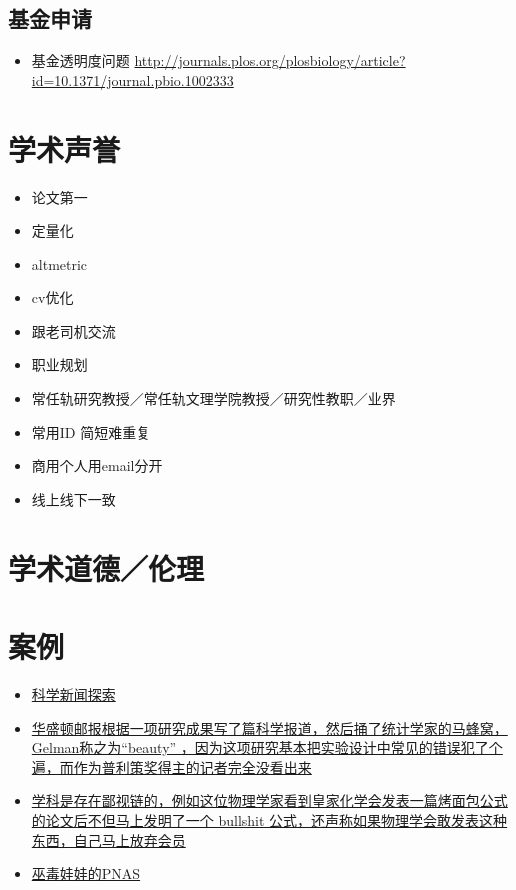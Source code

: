 \documentclass[]{book}
\providecommand{\tightlist}{%
  \setlength{\itemsep}{0pt}\setlength{\parskip}{0pt}}
\begin{document}
\subsection{基金申请}

\begin{itemize}
\tightlist
\item
  基金透明度问题
  \url{http://journals.plos.org/plosbiology/article?id=10.1371/journal.pbio.1002333}
\end{itemize}

\section{学术声誉}

\begin{itemize}
\tightlist
\item
  论文第一
\item
  定量化
\item
  altmetric
\item
  cv优化
\item
  跟老司机交流
\item
  职业规划
\item
  常任轨研究教授／常任轨文理学院教授／研究性教职／业界
\item
  常用ID 简短难重复
\item
  商用个人用email分开
\item
  线上线下一致
\end{itemize}

\section{学术道德／伦理}

\section{案例}

\begin{itemize}
\item
  \href{http://www.statschat.org.nz/2017/02/04/tracing-a-science-story/}{科学新闻探索}
\item
  \href{http://andrewgelman.com/2017/09/19/2010s-never-happened/}{华盛顿邮报根据一项研究成果写了篇科学报道，然后捅了统计学家的马蜂窝，Gelman称之为``beauty''
  ，因为这项研究基本把实验设计中常见的错误犯了个遍，而作为普利策奖得主的记者完全没看出来}
\item
  \href{http://wordpress.mrreid.org/2013/08/20/the-equation-for-the-perfect-equation/}{学科是存在鄙视链的，例如这位物理学家看到皇家化学会发表一篇烤面包公式的论文后不但马上发明了一个
  bullshit 公式，还声称如果物理学会敢发表这种东西，自己马上放弃会员}
\item
  \href{http://andrewgelman.com/2018/04/01/april-fools-post-dead-serious/}{巫毒娃娃的PNAS}
\end{itemize}
\end{document}
